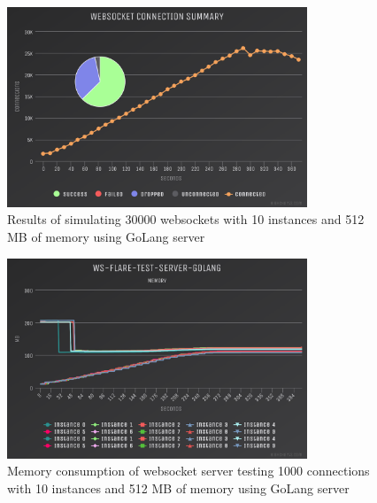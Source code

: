 \begin{figure}[H]
  \centering
    \includegraphics[width=0.8\textwidth]{figures/experiments/experiment-1/golang/conn-30000-512-10.png}
    \caption{Results of simulating 30000 websockets with 10 instances and 512 MB of memory using GoLang server}
    \label{fig:experiment-1-golang-conn-30000-512-10}
\end{figure}

\begin{figure}[H]
  \centering
    \includegraphics[width=0.8\textwidth]{figures/experiments/experiment-1/golang/memory-30000-512-10.png}
    \caption{Memory consumption of websocket server testing 1000 connections with 10 instances and 512 MB of memory using GoLang server}
    \label{fig:experiment-1-golang-memory-30000-512-10}
\end{figure}

